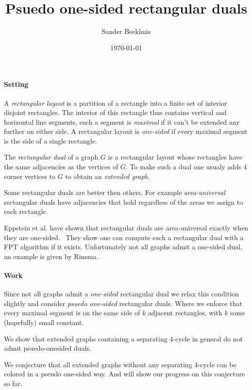 



\title{Psuedo one-sided rectangular duals}
\author{Sander Beekhuis}
\date{\today} %




\maketitle

\paragraph{Setting}

A \emph{rectangular layout} is a partition of a rectangle into a finite set of interior disjoint rectangles. The interior of this rectangle thus contains vertical and horizontal line segments, such a  segment is \emph{maximal} if it can't be extended any further on either side. A rectangular layout is \emph{one-sided} if every maximal segment is the side of a single rectangle.

The \emph{rectangular dual} of a graph $G$ is a rectangular layout whose rectangles have the same adjacencies as the vertices of $G$. To make such a dual one usualy adds 4 corner vertices to $G$ to obtain an \emph{extended graph}.

Some rectangular duals are better then others. For example \emph{area-universal} rectangular duals have adjacencies that hold regardless of the areas we assign to each rectangle.

Eppstein et al. have shown that rectangular duals are area-universal exactly when they are one-sided.~\cite{Eppstein2012} They show one can compute such a rectangular dual with a FPT algorithm if it exists. Unfortunately not all graphs admit a one-sided dual, an example is given by Rinsma.~\cite{Rinsma1987}

\paragraph{Work}
Since not all graphs admit a \emph{one-sided} rectangular dual we relax this condition slightly and consider \emph{psuedo one-sided} rectangular duals. Where we enforce that every maximal segment is on the same side of $k$ adjacent rectangles, with $k$ some (hopefully) small constant.

We show that extended graphs containing a separating 4-cycle in general do not admit psuedo-onesided duals.

We conjecture that all extended graphs without any separating 4-cycle can be colored in a pseudo one-sided way. And will show our progress on this conjecture so far.

\printbibliography


